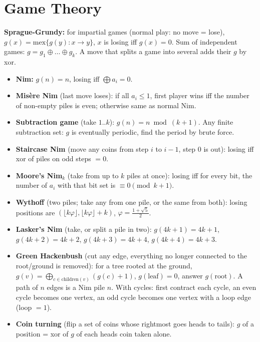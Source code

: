 \section{Game Theory}
	\textbf{Sprague-Grundy:} for impartial games (normal play: no move = lose),
	$g(x) = \mathrm{mex}\{g(y) : x \to y\}$, $x$ is losing iff $g(x) = 0$.
	Sum of independent games: $g = g_1 \oplus \dots \oplus g_k$.
	A move that splits a game into several adds their $g$ by xor.
	\begin{itemize}[noitemsep]
		\item \textbf{Nim:} $g(n) = n$, losing iff $\bigoplus a_i = 0$.
		\item \textbf{Misère Nim} (last move loses): if all $a_i \le 1$, first player wins iff the number of non-empty piles is even; otherwise same as normal Nim.
		\item \textbf{Subtraction game} (take $1..k$): $g(n) = n \bmod (k+1)$. Any finite subtraction set: $g$ is eventually periodic, find the period by brute force.
		\item \textbf{Staircase Nim} (move any coins from step $i$ to $i-1$, step $0$ is out): losing iff xor of piles on odd steps $= 0$.
		\item \textbf{Moore's Nim$_k$} (take from up to $k$ piles at once): losing iff for every bit, the number of $a_i$ with that bit set is $\equiv 0 \pmod{k+1}$.
		\item \textbf{Wythoff} (two piles; take any from one pile, or the same from both): losing positions are $(\lfloor k\varphi \rfloor, \lfloor k\varphi \rfloor + k)$, $\varphi = \frac{1+\sqrt 5}{2}$.
		\item \textbf{Lasker's Nim} (take, or split a pile in two): $g(4k+1) = 4k+1$, $g(4k+2) = 4k+2$, $g(4k+3) = 4k+4$, $g(4k+4) = 4k+3$.
		\item \textbf{Green Hackenbush} (cut any edge, everything no longer connected to the root/ground is removed): for a tree rooted at the ground,
		$g(v) = \bigoplus_{c \in \text{children}(v)} (g(c)+1)$, $g(\text{leaf}) = 0$, answer $g(\text{root})$. A path of $n$ edges is a Nim pile $n$.
		With cycles: first contract each cycle, an even cycle becomes one vertex, an odd cycle becomes one vertex with a loop edge (loop $= 1$).
		\item \textbf{Coin turning} (flip a set of coins whose rightmost goes heads to tails): $g$ of a position = xor of $g$ of each heads coin taken alone.
	\end{itemize}
